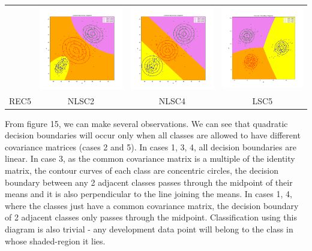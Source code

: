 \documentclass[11pt]{article}
\begin{document}
\begin{center}
\begin{tabular}{cccc}
  & \includegraphics[width=4.5cm]{classifier/NLS_plots/DecisionBoundary_Case2.png}
  & \includegraphics[width=4.5cm]{classifier/NLS_plots/DecisionBoundary_Case4.png}
  & \includegraphics[width=4.5cm]{classifier/LS_plots/DecisionBoundary_Case5.png} \\
  REC5 & NLSC2 & NLSC4 & LSC5\\
  \end{tabular}
\end{center}
From figure 15, we can make several observations. We can see that quadratic decision boundaries will occur only when all classes are allowed to have different covariance matrices (cases 2 and 5). In cases 1, 3, 4, all decision boundaries are linear. In case 3, as the common covariance matrix is a multiple of the identity matrix, the contour curves of each class are concentric circles, the decision boundary between any 2 adjacent classes passes through the midpoint of their means and it is also perpendicular to the line joining the means. In cases 1, 4, where the classes just have a common covariance matrix, the decision boundary of 2 adjacent classes only passes through the midpoint. Classification using this diagram is also trivial - any development data point will belong to the class in whose shaded-region it lies.
\end{document}
